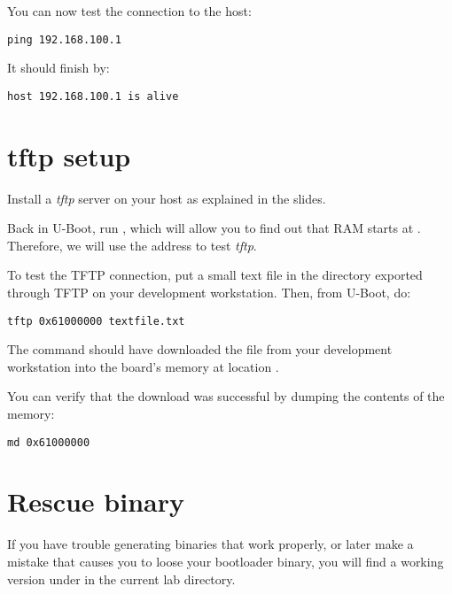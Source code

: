 You can now test the connection to the host:
\begin{verbatim}
ping 192.168.100.1
\end{verbatim}

It should finish by:
\begin{verbatim}
host 192.168.100.1 is alive
\end{verbatim}

\section{tftp setup}

Install a {\em tftp} server on your host as explained in the slides.

Back in U-Boot, run , which will allow you to find out that
RAM starts at . Therefore, we will use the 
address to test {\em tftp}.

To test the TFTP connection, put a small text file in
the directory exported through TFTP on your development
workstation. Then, from U-Boot, do:

\begin{verbatim}
tftp 0x61000000 textfile.txt
\end{verbatim}

The  command should have downloaded the
 file from your development workstation into
the board's memory at location .

You can verify that the download was successful by dumping the
contents of the memory:

\begin{verbatim}
md 0x61000000
\end{verbatim}

\section{Rescue binary}

If you have trouble generating binaries that work properly, or later
make a mistake that causes you to loose your bootloader binary, you
will find a working version under  in the current lab
directory.
